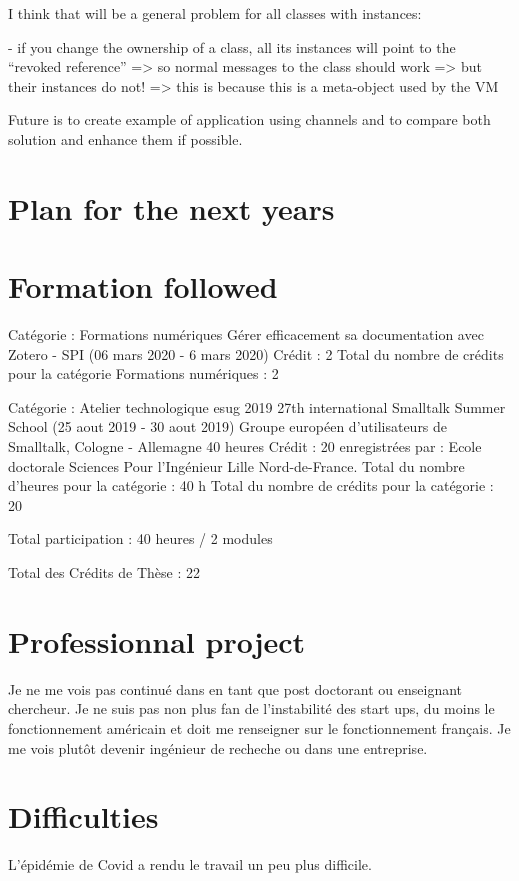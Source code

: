 \documentclass[11pt]{article} %
\begin{document}
I think that will be a general problem for all classes with instances:

 - if you change the ownership of a class, all its instances will point to the “revoked reference”
   => so normal messages to the class should work
   => but their instances do not!
      => this is because this is a meta-object used by the VM

 Future is to create example of application using channels and to compare both solution and enhance them if possible.

\section{Plan for the next years}
\section{Formation followed}

Catégorie : Formations numériques
Gérer efficacement sa documentation avec Zotero - SPI (06 mars 2020 - 6 mars 2020)
    Crédit : 2
Total du nombre de crédits pour la catégorie Formations numériques :   2

Catégorie : Atelier technologique
esug 2019 27th international Smalltalk Summer School (25 aout 2019 - 30 aout 2019) Groupe européen d'utilisateurs de Smalltalk, Cologne - Allemagne
  40 heures   Crédit : 20 enregistrées par : Ecole doctorale Sciences Pour l'Ingénieur Lille Nord-de-France.
Total du nombre d'heures pour la catégorie :    40 h
Total du nombre de crédits pour la catégorie :    20

Total participation : 40 heures / 2 modules

Total des Crédits de Thèse : 22
\section{Professionnal project}
Je ne me vois pas continué dans en tant que post doctorant ou enseignant chercheur. Je ne suis pas non plus fan de l'instabilité des start ups, du moins le fonctionnement américain et doit me renseigner sur le fonctionnement français. Je me vois plutôt devenir ingénieur de recheche ou dans une entreprise.

\section{Difficulties}
L'épidémie de Covid a rendu le travail un peu plus difficile.
\end{document}
